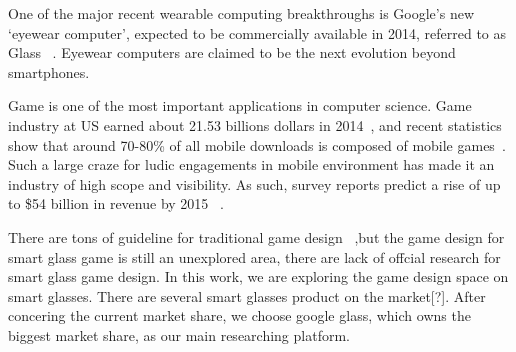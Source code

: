 
One of the major recent wearable computing breakthroughs is Google’s new ‘eyewear computer’, expected to be commercially available in 2014, referred to as Glass ~\cite{googleglass}. Eyewear computers are claimed to be the next evolution beyond smartphones.
 
Game is one of the most important applications in computer science. Game industry at US earned about 21.53 billions dollars in 2014~\cite{essentialfacts}, and recent statistics show that around 70-80\% of all mobile downloads is composed of mobile games~\cite{statistics,infographic}. Such a large craze for ludic engagements in mobile environment has made it an industry of high scope and visibility. As such, survey reports predict a rise of up to \$54 billion in revenue by 2015 ~\cite{statistics,infographic}.

There are tons of guideline for traditional game design ~\cite{videogame,mobilegame,bodygame,gameflow,argame,wearable},but the game design for smart glass game is still an unexplored area, there are lack of offcial research for smart glass game design. In this work, we are exploring the game design space on smart glasses. There are several smart glasses product on the market[?]. After concering the current market share, we choose google glass, which owns the biggest market share, as our main researching platform.

